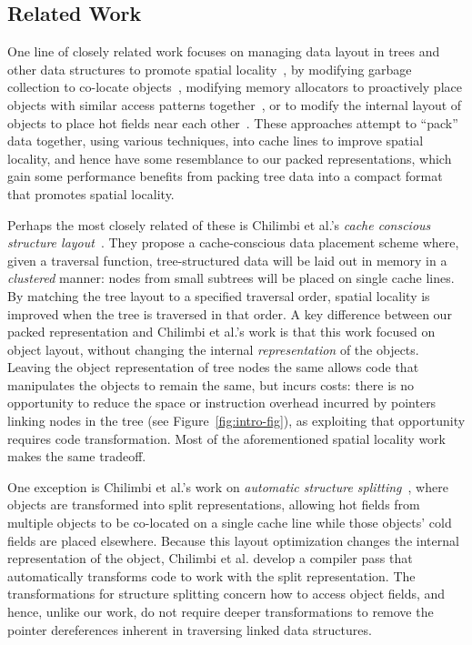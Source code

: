 \documentclass[preprint,10pt,nocopyrightspace,nonatbib]{./bibs/sigplanconf}
\begin{document}
\subsection{Related Work}


One line of closely related work focuses on managing data layout in trees and
other data structures to promote spatial
locality~\cite{Chilimbi1999,Chilimbi1999b,Truong1998,Lattner2005,Chilimbi1999a},
by modifying garbage collection to co-locate objects~\cite{Chilimbi1999a},
modifying memory allocators to proactively place objects with similar access
patterns together~\cite{Lattner2005,Chilimbi1999}, or to modify the internal
layout of objects to place hot fields near each other~\cite{Chilimbi1999b}.
These approaches attempt to ``pack'' data together, using various techniques,
into cache lines to improve spatial locality, and hence have some resemblance
to our packed representations, which gain some performance benefits from
packing tree data into a compact format that promotes spatial locality.

Perhaps the most closely related of these is Chilimbi et al.'s {\em cache
conscious structure layout}~\cite{Chilimbi1999}. They propose a
cache-conscious data placement scheme where, given a traversal function,
tree-structured data will be laid out in memory in a {\em clustered} manner:
nodes from small subtrees will be placed on single cache lines. By matching
the tree layout to a specified traversal order, spatial locality is improved
when the tree is traversed in that order. A key difference between our packed
representation and Chilimbi et al.'s work is that this work focused on object
layout, without changing the internal {\em representation} of the objects.
Leaving the object representation of tree nodes the same allows code that
manipulates the objects to remain the same, but incurs costs: there is no
opportunity to reduce the space or instruction overhead incurred by pointers
linking nodes in the tree (see Figure~\ref{fig:intro-fig}), as exploiting that
opportunity requires code transformation. Most of the aforementioned spatial
locality work makes the same tradeoff.

One exception is Chilimbi et al.'s work on {\em automatic structure
splitting}~\cite{Chilimbi1999b}, where objects are transformed into split
representations, allowing hot fields from multiple objects to be co-located on
a single cache line while those objects' cold fields are placed elsewhere.
Because this layout optimization changes the internal representation of the
object, Chilimbi et al. develop a compiler pass that automatically transforms
code to work with the split representation. The transformations for structure
splitting concern how to access object fields, and hence, unlike our work, do
not require deeper transformations to remove the pointer dereferences inherent
in traversing linked data structures.
\end{document}
